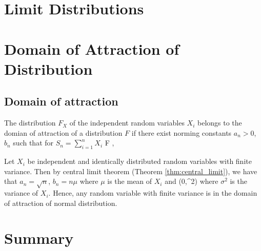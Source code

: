 \section{Limit Distributions}

\section{Domain of Attraction of Distribution}

\subsection{Domain of attraction}

\begin{definition}
The distribution $F_X$ of the independent random variables $X_i$ belongs to the domian of attraction of a distribution $F$ if there exist norming constants $a_n>0$, $b_n$ such that for $S_n  = \sum^n_{i=1}X_i$ %
\be
{}  F ,\qquad {}
\ee
\end{definition}

\begin{example}%
Let $X_i$ be independent and identically distributed random variables with finite variance. Then by central limit theorem (Theorem \ref{thm:central_limit}), we have that $a_n = \sqrt{n}$, $b_n = n\mu$ where $\mu$ is the mean of $X_i$ and
\be
{}  \sN(0,\sigma^2) 
\ee
where $\sigma^2$ is the variance of $X_i$. Hence, any random variable with finite variance is in the domain of attraction of normal distribution.
\end{example}

\section{Summary}

